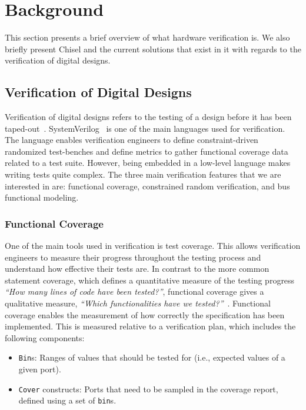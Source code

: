 \documentclass[conference]{IEEEtran}
\begin{document}
\section{Background}
\label{sec:background}

This section presents a brief overview of what hardware verification is. 
We also briefly present Chisel and the current solutions that exist in it with regards to the verification of digital designs.

\subsection{Verification of Digital Designs}
Verification of digital designs refers to the testing of a design before it has been taped-out~\cite{spear2008systemverilog}. 
SystemVerilog~\cite{SystemVerilog} is one of the main languages used for verification.
The language enables verification engineers to define constraint-driven randomized test-benches and define metrics to gather functional coverage data related to a test suite. 
However, being embedded in a low-level language makes writing tests quite complex. 
The three main verification features that we are interested in are: functional coverage, constrained random verification, and bus functional modeling.

\subsubsection{Functional Coverage}
One of the main tools used in verification is test coverage. 
This allows verification engineers to measure their progress throughout the testing process and understand how effective their tests are. 
In contrast to the more common statement coverage, which defines a quantitative measure of the testing progress \textit{``How many lines of code have been tested?''}, functional coverage gives a qualitative measure, \textit{``Which functionalities have we tested?''}~\cite{spear2008systemverilog}.
Functional coverage enables the measurement of how correctly the specification has been implemented. 
This is measured relative to a verification plan, which includes the following components:

\begin{itemize}
  \item \texttt{Bin}s: Ranges of values that should be tested for (i.e., expected values of a given port).
  \item \texttt{Cover} constructs: Ports that need to be sampled in the coverage report, defined using a set of \texttt{bin}s.
\end{itemize}
\end{document}
